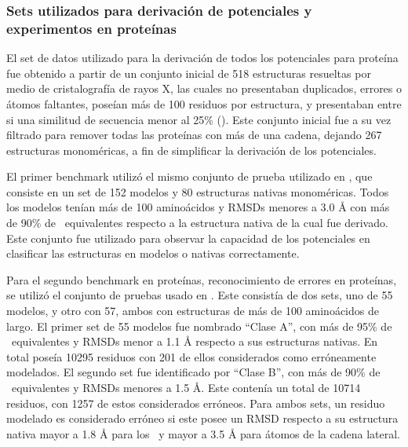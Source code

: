 \subsubsection{Sets utilizados para derivación de potenciales y experimentos en proteínas}
\par
El set de datos utilizado para la derivación de todos los potenciales para proteína fue obtenido a partir de un conjunto inicial de 518 estructuras resueltas por medio de cristalografía de rayos X, las cuales no presentaban duplicados, errores o átomos faltantes, poseían más de 100 residuos por estructura, y presentaban entre si una similitud de secuencia menor al 25\% (\cite{Ferrada2009}). 
Este conjunto inicial fue a su vez filtrado para remover todas las proteínas con más de una cadena, dejando 267 estructuras monoméricas, a fin de simplificar la derivación de los potenciales.
\par
El primer benchmark utilizó el mismo conjunto de prueba utilizado en \cite{Ferrada2007}, que consiste en un set de 152 modelos y 80 estructuras nativas monoméricas. 
Todos los modelos tenían más de 100 aminoácidos y RMSDs menores a 3.0 \si{\angstrom} con más de 90\% de \Ca\ equivalentes respecto a la estructura nativa de la cual fue derivado. 
Este conjunto fue utilizado para observar la capacidad de los potenciales en clasificar las estructuras en modelos o nativas correctamente.
\par
Para el segundo benchmark en proteínas, reconocimiento de errores en proteínas, se utilizó el conjunto de pruebas usado en \cite{Ferrada2009}.
Este consistía de dos sets, uno de 55 modelos, y otro con 57, ambos con estructuras de más de 100 aminoácidos de largo. 
El primer set de 55 modelos fue nombrado ``Clase A'', con más de 95\% de \Ca\ equivalentes y RMSDs menor a 1.1 \si{\angstrom} respecto a sus estructuras nativas. 
En total poseía 10295 residuos con 201 de ellos considerados como erróneamente modelados. 
El segundo set fue identificado por ``Clase B'', con más de 90\% de \Ca\ equivalentes y RMSDs menores a 1.5 \si{\angstrom}.
Este contenía un total de 10714 residuos, con 1257 de estos considerados erróneos. 
Para ambos sets, un residuo modelado es considerado erróneo si este posee un RMSD respecto a su estructura nativa mayor a 1.8 \si{\angstrom} para los \Ca\ y mayor a 3.5 \si{\angstrom} para átomos de la cadena lateral.
